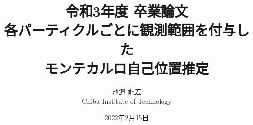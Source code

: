 \documentclass[a4paper,11pt]{jsbook}
\begin{document}
\title{令和3年度 卒業論文\\
各パーティクルごとに観測範囲を付与した\\モンテカルロ自己位置推定}

\author{池邉 龍宏 \\
Chiba Institute of Technology}

\date{2022年2月15日}

\maketitle



\tableofcontents



\cleardoublepage
{}
 






\appendix





\newpage
\printindex
\end{document}
